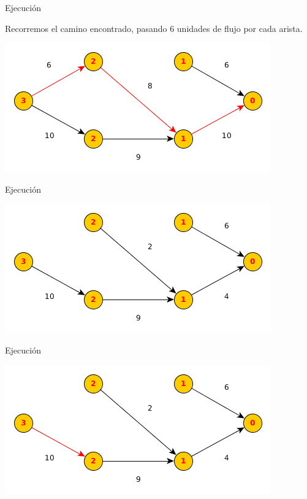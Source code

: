 \documentclass{beamer}
\begin{document}
\begin{frame}{Ejecución}

    Recorremos el camino encontrado, pasando 6 unidades de flujo por cada arista.
    
    \includegraphics[scale=0.6]{dinitz/dinitz9.png}
    
\end{frame}

\begin{frame}{Ejecución}

    
    \includegraphics[scale=0.6]{dinitz/dinitz10.png}
    
\end{frame}

\begin{frame}{Ejecución}

    
    \includegraphics[scale=0.6]{dinitz/dinitz11.png}
    
\end{frame}
\end{document}
